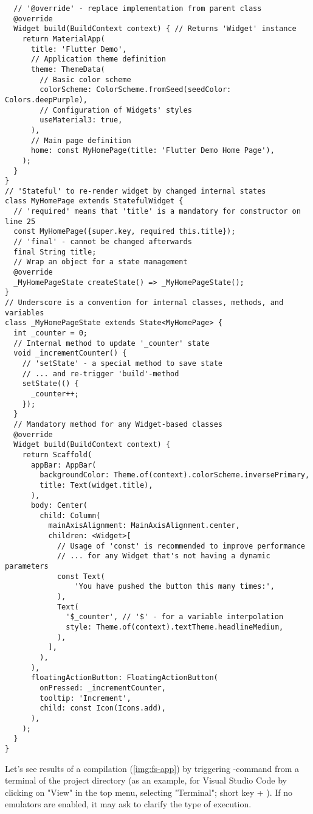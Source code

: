 \begin{lstlisting}
  // '@override' - replace implementation from parent class
  @override
  Widget build(BuildContext context) { // Returns 'Widget' instance
    return MaterialApp(
      title: 'Flutter Demo',
      // Application theme definition
      theme: ThemeData(
        // Basic color scheme
        colorScheme: ColorScheme.fromSeed(seedColor: Colors.deepPurple),
        // Configuration of Widgets' styles
        useMaterial3: true,
      ),
      // Main page definition
      home: const MyHomePage(title: 'Flutter Demo Home Page'),
    );
  }
}
// 'Stateful' to re-render widget by changed internal states
class MyHomePage extends StatefulWidget {
  // 'required' means that 'title' is a mandatory for constructor on line 25
  const MyHomePage({super.key, required this.title});
  // 'final' - cannot be changed afterwards
  final String title;
  // Wrap an object for a state management
  @override
  _MyHomePageState createState() => _MyHomePageState();
}
// Underscore is a convention for internal classes, methods, and variables
class _MyHomePageState extends State<MyHomePage> {
  int _counter = 0;
  // Internal method to update '_counter' state
  void _incrementCounter() {
    // 'setState' - a special method to save state
    // ... and re-trigger 'build'-method
    setState(() {
      _counter++;
    });
  }
  // Mandatory method for any Widget-based classes
  @override
  Widget build(BuildContext context) {
    return Scaffold(
      appBar: AppBar(
        backgroundColor: Theme.of(context).colorScheme.inversePrimary,
        title: Text(widget.title),
      ),
      body: Center(
        child: Column(
          mainAxisAlignment: MainAxisAlignment.center,
          children: <Widget>[
            // Usage of 'const' is recommended to improve performance
            // ... for any Widget that's not having a dynamic parameters
            const Text(
                'You have pushed the button this many times:',
            ),
            Text(
              '$_counter', // '$' - for a variable interpolation
              style: Theme.of(context).textTheme.headlineMedium,
            ),
          ],
        ),
      ),
      floatingActionButton: FloatingActionButton(
        onPressed: _incrementCounter,
        tooltip: 'Increment',
        child: const Icon(Icons.add),
      ),
    );
  }
}
\end{lstlisting}

Let's see results of a compilation (\cref{img:fs-app}) by triggering -command from a terminal of the 
project directory (as an example, for Visual Studio Code by clicking on "View" in the top menu, selecting "Terminal"; 
short key  + ). If no emulators are enabled, it may ask to clarify the type of execution.

